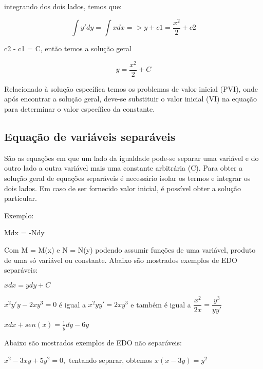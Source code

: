 			integrando dos dois lados, temos que: \linebreak
			
			\begin{equation}
				\int y' dy = \int x dx => y + c1 = \dfrac{x^2}{2} + c2 
			\end{equation}
			
			\begin{center}
				c2 - c1 = C, então temos a solução geral  \\
			\end{center}
			
			\begin{equation}
				y = \frac{x^2}{2} + C
			\end{equation}
		
	
	

Relacionado à solução específica temos os problemas de valor inicial (PVI), onde após encontrar a solução geral, deve-se substituir o valor inicial (VI) na equação para determinar o valor específico da constante.

		

\subsection[Equação de variáveis separáveis]{Equação de variáveis separáveis}
São as equações em que um lado da igualdade pode-se separar uma variável e do outro lado a outra variável mais uma constante arbitrária (C). 
Para obter a solução geral de equações separáveis é necessário isolar os termos e integrar os dois lados. Em caso de ser fornecido valor inicial, é possível obter a solução particular.

Exemplo: 
\begin{center}
 Mdx = -Ndy 
\end{center}

Com M = M(x) e N = N(y) podendo assumir funções de uma variável, produto de uma só variável ou constante. 
Abaixo são mostrados exemplos de EDO separáveis:


$
xdx = ydy + C 
$

 $ x^2y'y -2xy^3 = 0 $  é igual a $ x^2yy' = 2xy^3 $ e também é igual a  $ \dfrac{x^2}{2x} = \dfrac{y^3}{yy'} $

$ xdx + sen(x) = \frac{1}{y}dy - 6y $

Abaixo são mostrados exemplos de EDO não separáveis:

$ x^2 -3xy+5y^2 = 0, $ tentando separar, obtemos  $ x(x - 3y) = y^2 $ 
 

